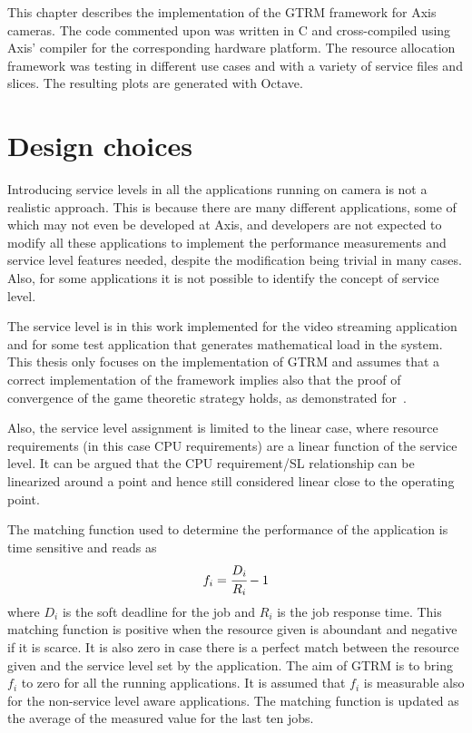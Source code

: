 \documentclass[nobiblatex]{LTHthesis}
\begin{document}
This chapter describes the implementation of the GTRM framework for
Axis cameras. The code commented upon was written in C and cross-compiled 
using Axis' compiler for the corresponding hardware platform. The resource
allocation framework was testing in different use cases and with a
variety of service files and slices. The resulting plots are generated with
Octave.

\section{Design choices}

Introducing service levels in all the applications running on camera
is not a realistic approach. This is because there are many different
applications, some of which may not even be developed at Axis, and 
developers are not expected to modify all these applications to implement 
the performance measurements and service level features needed, despite the
modification being trivial in many cases. Also, for some applications it is
not possible to identify the concept of service level. 

The service level is in this work implemented for the video streaming
application and for some test application that generates mathematical load
in the system. This thesis only focuses on the implementation of GTRM and 
assumes that a correct implementation of the framework implies also that
the proof of convergence of the game theoretic strategy holds, as
demonstrated for~\cite{gtrm}.

Also, the service level assignment is limited to the linear case, where
resource requirements (in this case CPU requirements) are a linear function 
of the service level. It can be argued that the CPU requirement/SL
relationship can be linearized around a point and hence still considered
linear close to the operating point. 

The matching function used to determine the performance of the application is
time sensitive and reads as
\begin{equation}
f_{i}=\cfrac{D_{i}}{R_{i}}-1
\label{eq:matchingfunctiongeneral}
\end{equation}
where $D_{i}$ is the soft deadline for the job and $R_{i}$ is the job 
response time. This matching function is positive when the resource given is
aboundant and negative if it is scarce. It is also zero in case there
is a perfect match between the resource given and the service level set by
the application. The aim of GTRM is to bring $f_i$ to zero for all the
running applications. It is assumed that $f_i$ is measurable also for the
non-service level aware applications. The matching function is updated as
the average of the measured value for the last ten jobs.
\end{document}
